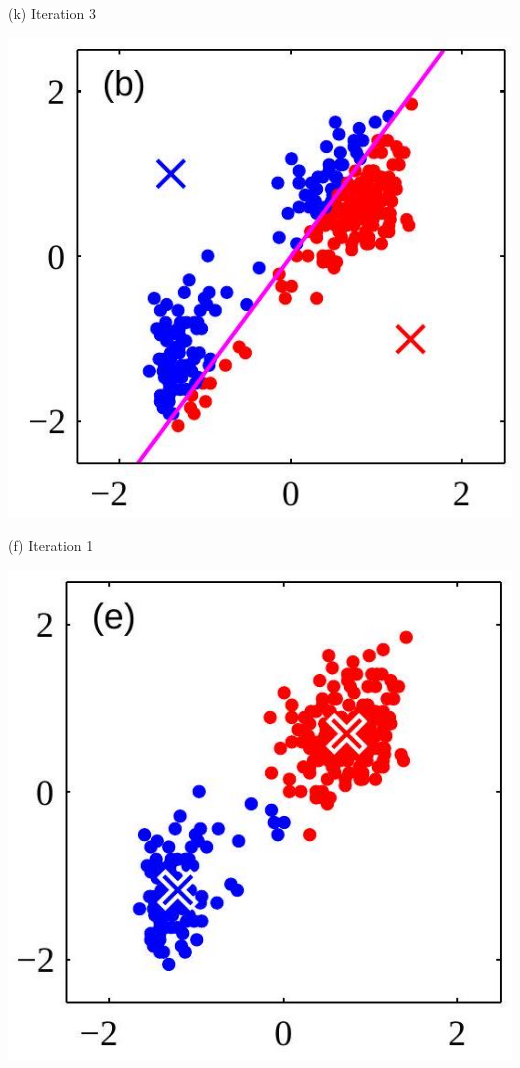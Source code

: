 \documentclass[10pt]{article}
\begin{document}
(k) Iteration 3

\begin{center}
\includegraphics[max width=\textwidth]{2023_12_30_43b7e6c218cb987b5fcag-6(1)}
\end{center}

(f) Iteration 1

\begin{center}
\includegraphics[max width=\textwidth]{2023_12_30_43b7e6c218cb987b5fcag-6}
\end{center}
\end{document}
